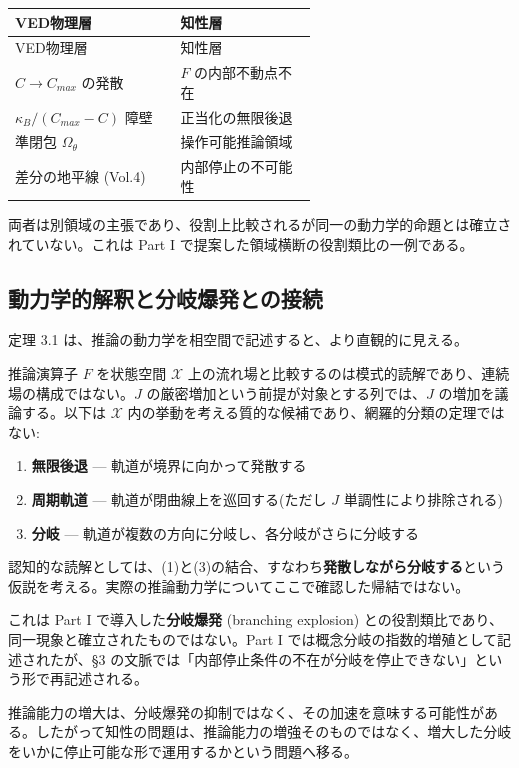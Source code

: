 \begin{longtable}{@{}p{0.30\linewidth}p{0.30\linewidth}@{}}
\toprule
VED物理層 & 知性層 \\
\midrule
\endfirsthead
\toprule
VED物理層 & 知性層 \\
\midrule
\endhead
$C \to C_{max}$ の発散 & $F$ の内部不動点不在 \\
$\kappa_B/(C_{max}-C)$ 障壁 & 正当化の無限後退 \\
準閉包 $\Omega_\theta$ & 操作可能推論領域 \\
差分の地平線 (Vol.4) & 内部停止の不可能性 \\
\bottomrule
\end{longtable}


両者は別領域の主張であり、役割上比較されるが同一の動力学的命題とは確立されていない。これは Part I で提案した領域横断の役割類比の一例である。

\bigskip


\subsection{動力学的解釈と分岐爆発との接続}


定理 3.1 は、推論の動力学を相空間で記述すると、より直観的に見える。

推論演算子 $F$ を状態空間 $\mathcal{X}$ 上の流れ場と比較するのは模式的読解であり、連続場の構成ではない。$J$ の厳密増加という前提が対象とする列では、$J$ の増加を議論する。以下は $\mathcal{X}$ 内の挙動を考える質的な候補であり、網羅的分類の定理ではない:

\begin{enumerate}
\item \textbf{無限後退} — 軌道が境界に向かって発散する
\item \textbf{周期軌道} — 軌道が閉曲線上を巡回する(ただし $J$ 単調性により排除される)
\item \textbf{分岐} — 軌道が複数の方向に分岐し、各分岐がさらに分岐する
\end{enumerate}


認知的な読解としては、(1)と(3)の結合、すなわち\textbf{発散しながら分岐する}という仮説を考える。実際の推論動力学についてここで確認した帰結ではない。

これは Part I で導入した\textbf{分岐爆発} (branching explosion) との役割類比であり、同一現象と確立されたものではない。Part I では概念分岐の指数的増殖として記述されたが、\S{}3 の文脈では「内部停止条件の不在が分岐を停止できない」という形で再記述される。

推論能力の増大は、分岐爆発の抑制ではなく、その加速を意味する可能性がある。したがって知性の問題は、推論能力の増強そのものではなく、増大した分岐をいかに停止可能な形で運用するかという問題へ移る。

